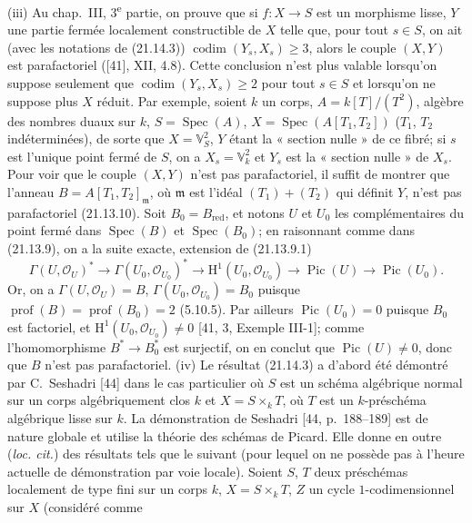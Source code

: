 \begin{env}[21.14.4]
(iii) Au chap.~III, 3\textsuperscript{e} partie, on prouve que si $f:X\to S$ est un
morphisme lisse, $Y$ une partie fermée localement constructible de $X$ telle que,
pour tout $s\in S$, on ait (avec les notations de (21.14.3))
$\operatorname{codim}(Y_s,X_s)\geq3$, alors le couple $(X,Y)$ est parafactoriel
([41], XII, 4.8). Cette conclusion n'est plus valable lorsqu'on suppose seulement que
$\operatorname{codim}(Y_s,X_s)\geq2$ pour tout $s\in S$ et lorsqu'on ne suppose plus
$X$ réduit. Par exemple, soient $k$ un corps, $A=k[T]/(T^2)$, algèbre des nombres
duaux sur $k$, $S=\operatorname{Spec}(A)$,
$X=\operatorname{Spec}(A[T_1,T_2])$ ($T_1$, $T_2$ indéterminées), de sorte que
$X=\mathbb V_S^2$, $Y$ étant la « section nulle » de ce fibré; si $s$ est l'unique
point fermé de $S$, on a $X_s=\mathbb V_k^2$ et $Y_s$ est la « section nulle » de
$X_s$. Pour voir que le couple $(X,Y)$ n'est pas parafactoriel, il suffit de montrer
que l'anneau $B=A[T_1,T_2]_\mathfrak m$, où $\mathfrak m$ est l'idéal
$(T_1)+(T_2)$ qui définit $Y$, n'est pas parafactoriel (21.13.10). Soit
$B_0=B_{\mathrm{red}}$, et notons $U$ et $U_0$ les complémentaires du point fermé
dans $\operatorname{Spec}(B)$ et $\operatorname{Spec}(B_0)$; en raisonnant comme
dans (21.13.9), on a la suite exacte, extension de (21.13.9.1)
\[
  \Gamma(U,\mathcal O_U)^*\longrightarrow\Gamma(U_0,\mathcal O_{U_0})^*
  \longrightarrow\mathrm H^1(U_0,\mathcal O_{U_0})
  \longrightarrow\operatorname{Pic}(U)\longrightarrow\operatorname{Pic}(U_0).
\]
Or, on a $\Gamma(U,\mathcal O_U)=B$, $\Gamma(U_0,\mathcal O_{U_0})=B_0$ puisque
$\operatorname{prof}(B)=\operatorname{prof}(B_0)=2$ (5.10.5). Par ailleurs
$\operatorname{Pic}(U_0)=0$ puisque $B_0$ est factoriel, et
$\mathrm H^1(U_0,\mathcal O_{U_0})\neq0$ [41, 3, Exemple III-1]; comme
l'homomorphisme $B^*\to B_0^*$ est surjectif, on en conclut que
$\operatorname{Pic}(U)\neq0$, donc que $B$ n'est pas parafactoriel.
(iv) Le résultat (21.14.3) a d'abord été démontré par C.~Seshadri [44] dans le cas
particulier où $S$ est un schéma algébrique normal sur un corps algébriquement clos
$k$ et $X=S\times_k T$, où $T$ est un $k$-préschéma algébrique lisse sur $k$. La
démonstration de Seshadri [44, p.~188--189] est de nature globale et utilise la
théorie des schémas de Picard. Elle donne en outre (\emph{loc. cit.}) des résultats
tels que le suivant (pour lequel on ne possède pas à l'heure actuelle de démonstration
par voie locale). Soient $S$, $T$ deux préschémas localement de type fini sur un
corps $k$, $X=S\times_k T$, $Z$ un cycle $1$-codimensionnel sur $X$ (considéré comme

\end{env}
